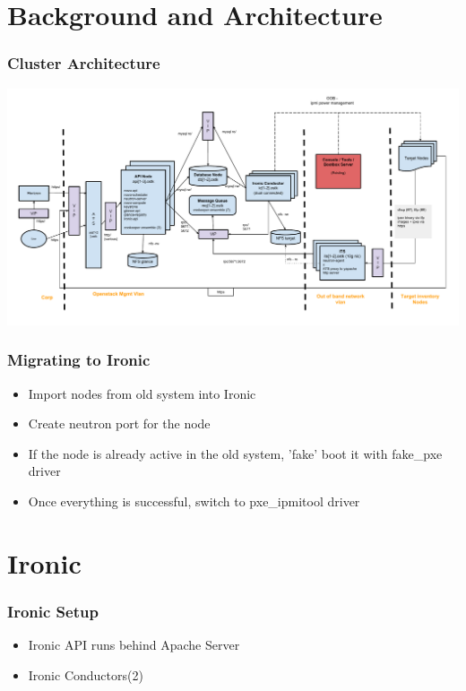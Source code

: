 \documentclass[aspectratio=169,11pt,hyperref={colorlinks=true}]{beamer}
\begin{document}
\section{Background and Architecture}

\begin{frame}
\frametitle{Cluster Architecture}
    \begin{center}
        \includegraphics[scale=0.40]{logos/ironic_arch.pdf}
    \end{center}
\end{frame}


\begin{frame}
\frametitle{Migrating to Ironic}
    \begin{itemize}[<+-| alert@+>]
        \item Import nodes from old system into Ironic
        \item Create neutron port for the node
        \item If the node is already active in the old system, 'fake' boot it with fake\_pxe driver
        \item Once everything is successful, switch to pxe\_ipmitool driver
    \end{itemize}
\end{frame}

\section{Ironic}

\begin{frame}
\frametitle{Ironic Setup}
    \begin{itemize}[<+-| alert@+>]
        \item Ironic API runs behind Apache Server
        \item Ironic Conductors(2)
    \end{itemize}
\end{frame}
\end{document}
